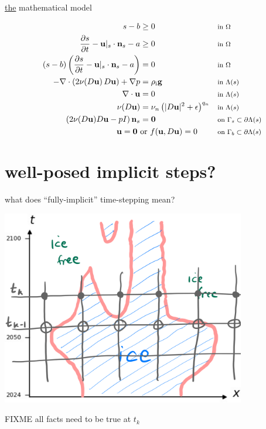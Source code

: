 \documentclass[10pt,dvipsnames]{beamer}
\newcommand{\bg}{\mathbf{g}}
\newcommand{\bn}{\mathbf{n}}
\newcommand{\bu}{\mathbf{u}}
\newcommand{\bzero}{\bm{0}}
\newcommand{\eps}{\epsilon}
\newcommand{\rhoi}{\rho_{\text{i}}}
\newcommand{\where}[1]{\text{\footnotesize #1}}
\newcommand{\viewin}[1]{{\footnotesize \emph{this view appears in} #1}}
\begin{document}
\begin{frame}{\underline{the} mathematical model}

\begin{align*}
s - b &\ge 0 & &\where{in $\Omega$} \\
\frac{\partial s}{\partial t} - \bu|_s \cdot \bn_s - a &\ge 0 & &\where{in $\Omega$} \\
(s - b) \left(\frac{\partial s}{\partial t} - \bu|_s \cdot \bn_s - a\right) &= 0 & &\where{in $\Omega$} \\
- \nabla \cdot \left(2 \nu(D\bu)\, D\bu\right) + \nabla p &= \rhoi \bg && \where{in $\Lambda(s)$} \\
\nabla \cdot \bu &= 0 && \where{in $\Lambda(s)$} \\
\nu(D\bu) &= \nu_n \left(|D\bu|^2 + \eps\right)^{q_n} && \where{in $\Lambda(s)$} \\
\left(2 \nu(D\bu) D\bu - pI\right) \bn_s &= \bzero && \where{on $\Gamma_s \subset \partial\Lambda(s)$} \\
\bu  = \bzero \text{ } &\text{or } f(\bu,D\bu)=0 && \where{on $\Gamma_b \subset \partial\Lambda(s)$}
\end{align*}
\end{frame}




\section{well-posed implicit steps?}

\begin{frame}{what does ``fully-implicit'' time-stepping mean?}

\begin{center}
\includegraphics[width=0.8\textwidth]{implicitstep}
\end{center}

\medskip
FIXME all facts need to be true at $t_k$
\end{frame}
\end{document}
